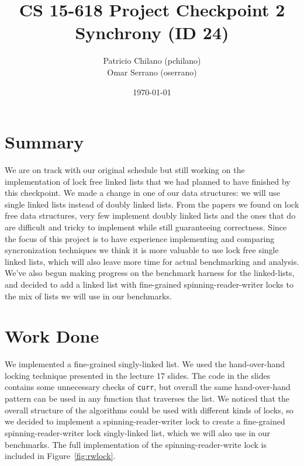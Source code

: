 \documentclass[11pt]{article}
\title{\vspace{-25pt}
\huge CS 15-618 Project Checkpoint 2 \\
\huge Synchrony (ID 24)
}
\author{
    Patricio Chilano (pchilano) \\
    Omar Serrano (oserrano)
}
\date{\today}
\begin{document}


\maketitle

\section*{Summary}
We are on track with our original schedule but still working on the
implementation of lock free linked lists that we had planned to have finished by
this checkpoint. We made a change in one of our data structures: we will use
single linked lists instead of doubly linked lists. From the papers we found on
lock free data structures, very few implement doubly linked lists and the ones
that do \cite{Sundell} are difficult and tricky to implement while still
guaranteeing correctness. Since the focus of this project is to have experience
implementing and comparing syncronization techniques we think it is more valuable
to use lock free single linked lists, which will also leave more time for actual
benchmarking and analysis. We've also begun making progress on the benchmark
harness for the linked-lists, and decided to add a linked list with fine-grained
spinning-reader-writer locks to the mix of lists we will use in our benchmarks.

\section*{Work Done}
We implemented a fine-grained singly-linked list. We used the hand-over-hand
locking technique presented in the lecture 17 slides. The code in the slides
contains some unnecessary checks of {\tt curr}, but overall the same
hand-over-hand pattern can be used in any function that traverses the list. We
noticed that the overall structure of the algorithms could be used with
different kinds of locks, so we decided to implement a spinning-reader-writer
lock to create a fine-grained spinning-reader-writer lock singly-linked list,
which we will also use in our benchmarks. The full implementation of the
spinning-reader-write lock is included in Figure~\ref{fig:rwlock}.
\end{document}
